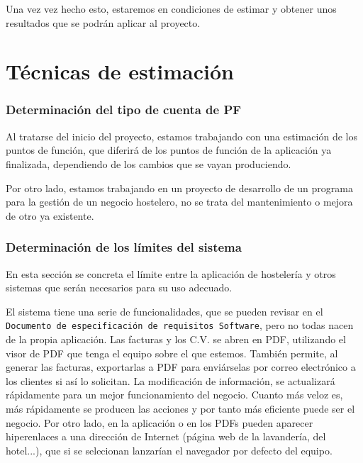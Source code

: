 \documentclass[spanish,a4paper,12pt]{report}	%
\begin{document}
\vspace{0.35cm}

Una vez vez hecho esto, estaremos en condiciones de estimar y obtener unos resultados que se podrán aplicar al proyecto. %

\newpage
\mbox{}
\thispagestyle{empty}						%
\newpage
\setcounter{section}{0}

\part{Técnicas de estimación} %
\section{Determinación del tipo de cuenta de PF}
Al tratarse del inicio del proyecto, estamos trabajando con una estimación de los puntos de función, que diferirá de los puntos de función de la aplicación ya finalizada, dependiendo de los cambios que se vayan produciendo. 

Por otro lado, estamos trabajando en un proyecto de desarrollo de un programa para la gestión de un negocio hostelero, no se trata del mantenimiento o mejora de otro ya existente.

\section{Determinación de los límites del sistema}
En esta sección se concreta el límite entre la aplicación de hostelería y otros sistemas que serán necesarios para su uso adecuado.

El sistema tiene una serie de funcionalidades, que se pueden revisar en el \texttt{Documento de especificación de requisitos Software}, pero no todas nacen de la propia aplicación. Las facturas y los C.V. se abren en PDF, utilizando el visor de PDF que tenga el equipo sobre el que estemos. También permite, al generar las facturas, exportarlas a PDF para enviárselas por correo electrónico a los clientes si así lo solicitan. La modificación de información, se actualizará rápidamente para un mejor funcionamiento del negocio. Cuanto más veloz es, más rápidamente se producen las acciones y por tanto más eficiente puede ser el negocio.
Por otro lado, en la aplicación o en los PDFs pueden aparecer hiperenlaces a una dirección de Internet (página web de la lavandería, del hotel...), que si se selecionan lanzarían el navegador por defecto del equipo.
\end{document}
